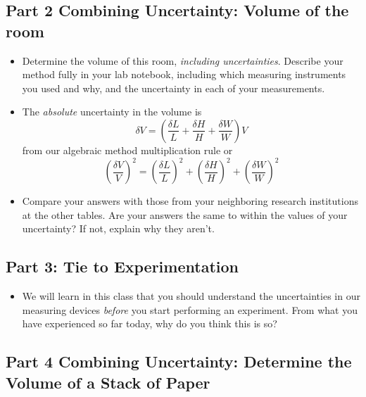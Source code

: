 \documentclass[twoside,11pt,ShortChapTitles]{BYUTextbook}
\begin{document}
\subsection{Part 2 Combining Uncertainty: Volume of the room}

\begin{itemize}
\item Determine the volume of this room, {\em including uncertainties}. Describe
your method fully in your lab notebook, including which measuring instruments
you used and why, and the uncertainty in each of your measurements.

\item The {\em absolute} uncertainty in the volume is
\[
\delta V=\left(\frac{\delta L}{L}+\frac{\delta H}{H}+\frac{\delta W}{W}\right)V
\]
from our algebraic method multiplication rule or
\[
\left(\frac{\delta V}{V}\right)^2=\left(\frac{\delta L}{L}\right)^2+\left(\frac{\delta H}{H}\right)^2+\left(\frac{\delta W}{W}\right)^2
\]

\item Compare your answers with those from your neighboring research
institutions at the other tables. Are your answers the same to within the
values of your uncertainty? If not, explain why they aren't.
\end{itemize}

\subsection{Part 3: Tie to Experimentation}

\begin{itemize}
\item We will learn in this class that you should understand the uncertainties
in our measuring devices \emph{before} you start performing an experiment.
From what you have experienced so far today, why do you think this is so?
\end{itemize}



\subsection{Part 4 Combining Uncertainty: Determine the Volume of a Stack of
Paper}
\end{document}
